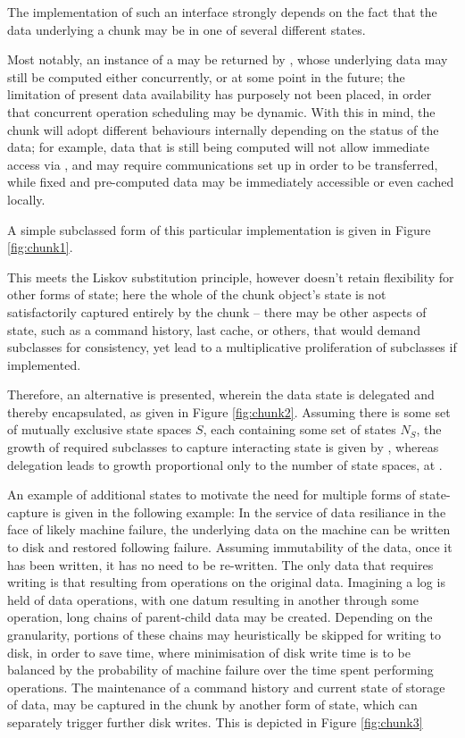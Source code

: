\documentclass[10pt, a4paper]{article}
\begin{document}
The implementation of such an interface strongly depends on the fact that the data underlying a chunk may be in one of several different states. 

Most notably, an instance of a  may be returned by , whose underlying data may still be computed either concurrently, or at some point in the future; the limitation of present data availability has purposely not been placed, in order that concurrent operation scheduling may be dynamic.
With this in mind, the chunk will adopt different behaviours internally depending on the status of the data; for example, data that is still being computed will not allow immediate access via , and may require communications set up in order to be transferred, while fixed and pre-computed data may be immediately accessible or even cached locally.

A simple subclassed form of this particular implementation is given in Figure \ref{fig:chunk1}.


This meets the Liskov substitution principle\cite{liskov1988lsp}, however doesn't retain flexibility for other forms of state; here the whole of the chunk object's state is not satisfactorily captured entirely by the chunk -- there may be other aspects of state, such as a command history, last cache, or others, that would demand subclasses for consistency, yet lead to a multiplicative proliferation of subclasses if implemented.

Therefore, an alternative is presented, wherein the data state is delegated and thereby encapsulated, as given in Figure \ref{fig:chunk2}. 
Assuming there is some set of mutually exclusive state spaces $S$, each containing some set of states $N_S$, the growth of required subclasses to capture interacting state is given by , whereas delegation leads to  growth proportional only to the number of state spaces, at .


An example of additional states to motivate the need for multiple forms of state-capture is given in the following example:
In the service of data resiliance in the face of likely machine failure, the underlying data on the machine can be written to disk and restored following failure.
Assuming immutability of the data, once it has been written, it has no need to be re-written.
The only data that requires writing is that resulting from operations on the original data.
Imagining a log is held of data operations, with one datum resulting in another through some operation, long chains of parent-child data may be created.
Depending on the granularity, portions of these chains may heuristically be skipped for writing to disk, in order to save time, where minimisation of disk write time is to be balanced by the probability of machine failure over the time spent performing operations.
The maintenance of a command history and current state of storage of data, may be captured in the chunk by another form of state, which can separately trigger further disk writes.
This is depicted in Figure \ref{fig:chunk3}
\end{document}
